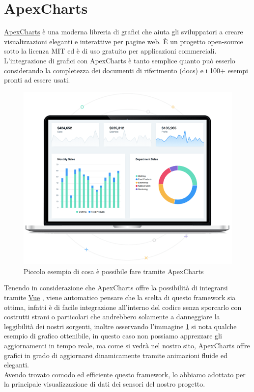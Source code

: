 \documentclass[a4paper,12pt]{report}
\newcommand{\vue}{\href{https://vuejs.org/}{Vue} }
\newcommand{\apexcharts}{\href{https://apexcharts.com/}{ApexCharts} }
\begin{document}
\section{ApexCharts}
\apexcharts è una moderna libreria di grafici che aiuta gli sviluppatori a creare visualizzazioni eleganti e interattive per pagine web. È un progetto open-source sotto la licenza MIT ed è di uso gratuito per applicazioni commerciali.\\
L'integrazione di grafici con ApexCharts è tanto semplice quanto può esserlo considerando la completezza dei documenti di riferimento (docs) e i 100+ esempi pronti ad essere usati.\\
\begin{figure}[h!]
	\centering
	\includegraphics[scale=0.7]{apexchart.png}
	\caption{Piccolo esempio di cosa è possibile fare tramite ApexCharts}
	\label{fig:apexchart}
\end{figure}
Tenendo in considerazione che ApexCharts offre la possibilità di integrarsi tramite \vue, viene automatico pensare che la scelta di questo framework sia ottima, infatti è di facile integrazione all'interno del codice senza sporcarlo con costrutti strani o particolari che andrebbero solamente a danneggiare la leggibilità dei nostri sorgenti, inoltre osservando l'immagine \ref{fig:apexchart} si nota qualche esempio di grafico ottenibile, in questo caso non possiamo apprezzare gli aggiornamenti in tempo reale, ma come si vedrà nel nostro sito, ApexCharts offre grafici in grado di aggiornarsi dinamicamente tramite animazioni fluide ed eleganti.\\
Avendo trovato comodo ed efficiente questo framework, lo abbiamo adottato per la principale visualizzazione di dati dei sensori del nostro progetto.
\end{document}
